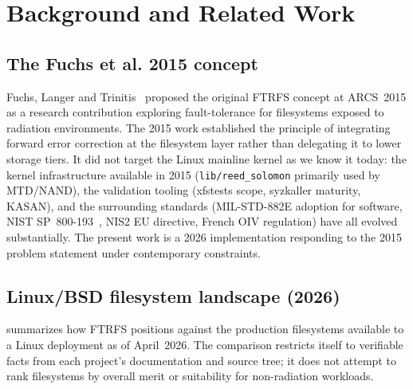 \section{Background and Related Work}\label{sec:related}

\subsection{The Fuchs et al. 2015 concept}

Fuchs, Langer and Trinitis~\cite{fuchs2015ftrfs} proposed the
original FTRFS concept at ARCS~2015 as a research contribution
exploring fault-tolerance for filesystems exposed to radiation
environments. The 2015 work established the principle of integrating
forward error correction at the filesystem layer rather than
delegating it to lower storage tiers. It did not target the Linux
mainline kernel as we know it today: the kernel infrastructure
available in 2015 (\texttt{lib/reed\_solomon} primarily used by
MTD/NAND), the validation tooling (xfstests scope, syzkaller maturity,
KASAN), and the surrounding standards (MIL-STD-882E adoption for
software, NIST SP~800-193~\cite{nistsp800193}, NIS2 EU directive,
French OIV regulation) have all evolved substantially. The present
work is a 2026 implementation responding to the 2015 problem
statement under contemporary constraints.

\subsection{Linux/BSD filesystem landscape (2026)}

 summarizes how FTRFS positions against
the production filesystems available to a Linux deployment as of
April~2026. The comparison restricts itself to verifiable facts
from each project's documentation and source tree; it does not
attempt to rank filesystems by overall merit or suitability for
non-radiation workloads.

